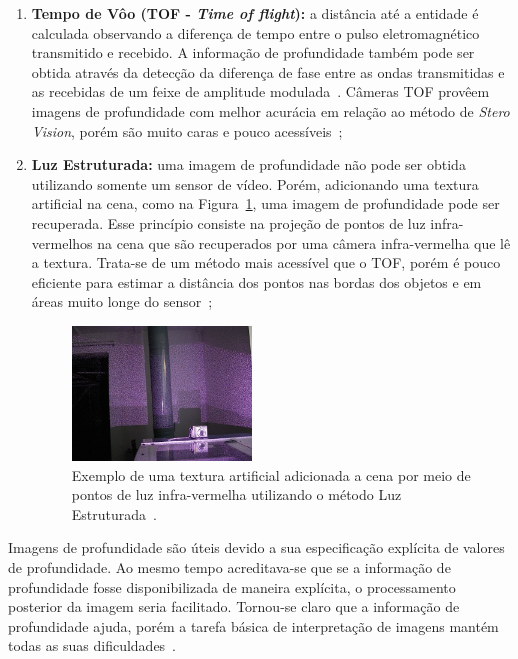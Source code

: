 \begin{enumerate}
		\item \textbf{Tempo de Vôo (TOF - \textit{Time of flight}):} a distância até a
		entidade é calculada observando a diferença de tempo entre o pulso
		eletromagnético transmitido e recebido. A informação de profundidade também pode
		ser obtida através da detecção da diferença de fase entre as ondas transmitidas
		e as recebidas de um feixe de amplitude modulada~\cite{jain, fall-detection}.
		Câmeras TOF provêem imagens de profundidade com melhor acurácia em relação ao
		método de \textit{Stero Vision}, porém são muito caras e pouco
		acessíveis~\cite{fall-detection};
		
		\item \textbf{Luz Estruturada:} uma imagem de
		profundidade não pode ser obtida utilizando somente um sensor de vídeo. Porém,
		adicionando uma textura artificial na cena, como na
		Figura~\ref{fig:structured-light}, uma imagem de profundidade pode ser
		recuperada. Esse princípio consiste na projeção de pontos de luz infra-vermelhos
		na cena que são recuperados por uma câmera infra-vermelha que lê a textura.
		Trata-se de um método mais acessível que o TOF, porém é pouco eficiente
		para estimar a distância dos pontos nas bordas dos objetos e em áreas muito
		longe do sensor~\cite{fall-detection};
		
		\begin{figure}[H]
			\begin{center}
				\includegraphics[width=0.45\textwidth]{figuras/2.FundamentacaoTeorica/structured-light.jpg}
			\end{center}
			\caption{Exemplo de uma textura artificial adicionada a cena por meio de
			pontos de luz infra-vermelha utilizando o método Luz Estruturada~\cite{img-strutuctured-light}.}
			\label{fig:structured-light}
		\end{figure}
	\end{enumerate}

	Imagens de profundidade são úteis devido a sua especificação explícita de
	valores de profundidade. Ao mesmo tempo acreditava-se que se a informação de
	profundidade fosse disponibilizada de maneira explícita, o processamento
	posterior da imagem seria facilitado. Tornou-se claro que a informação de
	profundidade ajuda, porém a tarefa básica de interpretação de imagens mantém
	todas as suas dificuldades~\cite{jain}.

